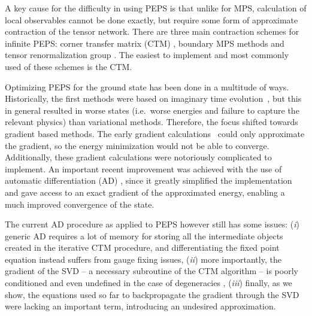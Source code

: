 \documentclass[twocolumn,floatfix,superscriptaddress,longbibliography,pra]{revtex4-2}
\begin{document}
A key cause for the difficulty in using PEPS is that unlike for MPS, calculation of local observables cannot be done exactly, but require some form of approximate contraction of the tensor network. There are three main contraction schemes for infinite PEPS: corner transfer matrix (CTM) \cite{Baxter_CTM_78,Baxter_Textbook_82,CTMRG}, boundary MPS methods \cite{boundaryMPS} and tensor renormalization group \cite{TRG}. 
The easiest to implement and most commonly used of these schemes is the CTM. 

Optimizing PEPS for the ground state has been done in a multitude of ways. Historically, the first methods were based on imaginary time evolution~\cite{simple_update,full_update,fastfull_update,NTU},
but this in general resulted in worse states (i.e.\ worse energies and failure to capture the relevant physics) than variational methods. 
Therefore, the focus shifted towards gradient based methods. The early gradient calculations~\cite{Corboz_PEPS_gradient,Var_iPEPS2,topo_Corboz} could only approximate the gradient, so the energy minimization would not be able to converge. 
Additionally, these gradient calculations were notoriously complicated to implement.  
An important recent improvement was achieved with the use of automatic differentiation (AD) \cite{AD_CTM,Juraj_1AD}, since it greatly simplified the implementation and gave access to an exact gradient of the approximated energy, enabling a much improved convergence of the state.

The current AD procedure as applied to PEPS however still has some issues: (\emph{i}) generic AD requires a lot of memory for storing all the intermediate objects created in the iterative CTM procedure, and differentiating the fixed point equation instead suffers from gauge fixing issues, (\emph{ii}) more importantly, the gradient of the SVD -- a necessary subroutine of the CTM algorithm -- is poorly conditioned and even undefined in the case of degeneracies \cite{AD_CTM,variPEPS}, (\emph{iii}) finally, as we show, the equations used so far to backpropagate the gradient through the SVD were lacking an important term, introducing an undesired approximation. 
\end{document}
